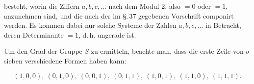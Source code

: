 besteht, worin die Ziffern $a, b, c, \ldots$ nach dem Modul 2, also $= 0$
oder $= 1$, anzunehmen sind, und die nach der im \S.\,37 gegebenen
Vorschrift componirt werden. Es kommen dabei nur solche
Systeme der Zahlen $a, b, c, \ldots$ in Betracht, deren Determinante
$= 1$, d.\,h. ungerade ist.

Um den Grad der Gruppe $S$ zu ermitteln, beachte man, dass
die erste Zeile von $\sigma$ sieben verschiedene Formen haben kann:

\[
(1,0,0),\ (0,1,0),\ (0,0,1),\ (0,1,1),\ (1,0,1),\ (1,1,0),\ (1,1,1).
\]
